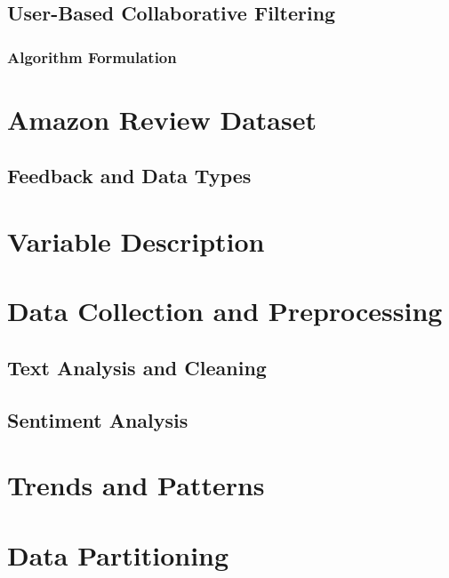 \subsection{User-Based Collaborative Filtering}
\label{subsec:User-Based Collaborative Filtering}

\subsubsection{Algorithm Formulation}
\label{subsubsec:Algorithm Formulation}

\section{Amazon Review Dataset}
\label{subsec:Amazon Review Dataset}

\subsection{Feedback and Data Types}
\label{subsubsec:Feedback and Data Types}

\section{Variable Description}
\label{sec:Variable Description}

\section{Data Collection and Preprocessing}
\label{sec:Data Collection and Preprocessing}

\subsection{Text Analysis and Cleaning}
\label{subsec:Text Analysis and Cleaning}

\subsection{Sentiment Analysis}
\label{subsec:Sentiment Analysis}

\section{Trends and Patterns}
\label{sec:Trends and Patterns}

\section{Data Partitioning}
\label{sec:Data Partitioning}

